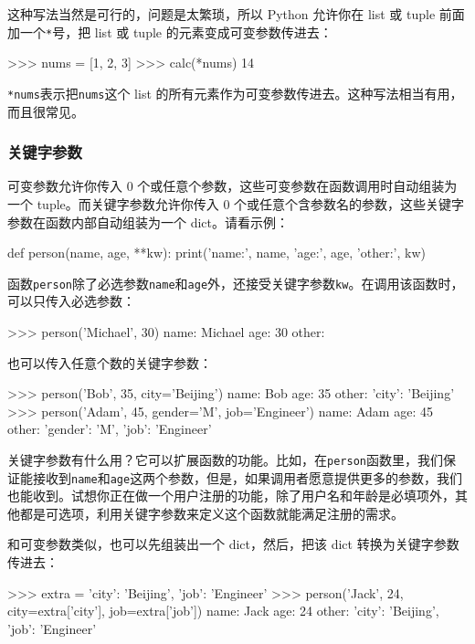 这种写法当然是可行的，问题是太繁琐，所以 Python 允许你在 list 或 tuple
前面加一个\texttt{*}号，把 list 或 tuple 的元素变成可变参数传进去：

\begin{pythoncode}
>>> nums = [1, 2, 3]
>>> calc(*nums)
14
\end{pythoncode}

\texttt{*nums}表示把\texttt{nums}这个 list
的所有元素作为可变参数传进去。这种写法相当有用，而且很常见。

\hypertarget{ux5173ux952eux5b57ux53c2ux6570}{%
\subsubsection{关键字参数}\label{ux5173ux952eux5b57ux53c2ux6570}}

可变参数允许你传入 0
个或任意个参数，这些可变参数在函数调用时自动组装为一个
tuple。而关键字参数允许你传入 0
个或任意个含参数名的参数，这些关键字参数在函数内部自动组装为一个
dict。请看示例：

\begin{pythoncode}
def person(name, age, **kw):
    print('name:', name, 'age:', age, 'other:', kw)
\end{pythoncode}

函数\texttt{person}除了必选参数\texttt{name}和\texttt{age}外，还接受关键字参数\texttt{kw}。在调用该函数时，可以只传入必选参数：

\begin{pythoncode}
>>> person('Michael', 30)
name: Michael age: 30 other: {}
\end{pythoncode}

也可以传入任意个数的关键字参数：

\begin{pythoncode}
>>> person('Bob', 35, city='Beijing')
name: Bob age: 35 other: {'city': 'Beijing'}
>>> person('Adam', 45, gender='M', job='Engineer')
name: Adam age: 45 other: {'gender': 'M', 'job': 'Engineer'}
\end{pythoncode}

关键字参数有什么用？它可以扩展函数的功能。比如，在\texttt{person}函数里，我们保证能接收到\texttt{name}和\texttt{age}这两个参数，但是，如果调用者愿意提供更多的参数，我们也能收到。试想你正在做一个用户注册的功能，除了用户名和年龄是必填项外，其他都是可选项，利用关键字参数来定义这个函数就能满足注册的需求。

和可变参数类似，也可以先组装出一个 dict，然后，把该 dict
转换为关键字参数传进去：

\begin{pythoncode}
>>> extra = {'city': 'Beijing', 'job': 'Engineer'}
>>> person('Jack', 24, city=extra['city'], job=extra['job'])
name: Jack age: 24 other: {'city': 'Beijing', 'job': 'Engineer'}
\end{pythoncode}


